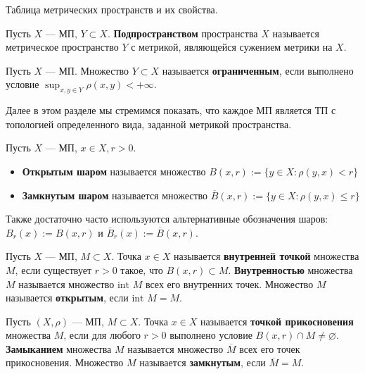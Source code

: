 \begin{remark}
	Таблица метрических пространств и их свойства.
\end{remark}

\begin{definition}[Подпространство]
	Пусть $X$ — МП, $Y \subset X$. \textbf{Подпространством} пространства $X$ называется метрическое пространство $Y$ с метрикой, являющейся сужением метрики на $X$.
\end{definition}

\begin{definition}[Ограниченность]
	Пусть $X$ — МП. Множество $Y \subset X$ называется \textbf{ограниченным}, если выполнено условие $\sup_{x,y \in Y} \rho(x, y) < +\infty$.
\end{definition}

\begin{remark}
	Далее в этом разделе мы стремимся показать, что каждое МП является ТП с топологией определенного вида, заданной метрикой пространства.
\end{remark}

\begin{definition}[Шары]
	Пусть $X$ — МП, $x \in X, r > 0$.
	\begin{itemize}
		\item \textbf{Открытым шаром} называется множество $B(x, r) := \{y \in X : \rho(y, x) < r\}$
		\item \textbf{Замкнутым шаром} называется множество $\overline{B}(x, r) := \{y \in X : \rho(y, x) \leqslant r\}$
	\end{itemize}
\end{definition}

\begin{remark}
	Также достаточно часто используются альтернативные обозначения шаров: $B_r(x) := B(x, r)$ и $\overline{B}_r(x) := \overline{B}(x, r)$.
\end{remark}

\begin{definition}[Внутренность]
	Пусть $X$ — МП, $M \subset X$. Точка $x \in X$ называется \textbf{внутренней точкой} множества $M$, если существует $r > 0$ такое, что $B(x, r) \subset M$. \textbf{Внутренностью} множества $M$ называется множество $\text{int } M$ всех его внутренних точек. Множество $M$ называется \textbf{открытым}, если $\text{int } M = M$.
\end{definition}

\begin{definition}[Замыкание]
	Пусть $(X, \rho)$ — МП, $M \subset X$. Точка $x \in X$ называется \textbf{точкой прикосновения} множества $M$, если для любого $r > 0$ выполнено условие $B(x, r) \cap M \neq \varnothing$. \textbf{Замыканием} множества $M$ называется множество $\overline{M}$ всех его точек прикосновения. Множество $M$ называется \textbf{замкнутым}, если $\overline{M} = M$.
\end{definition}


